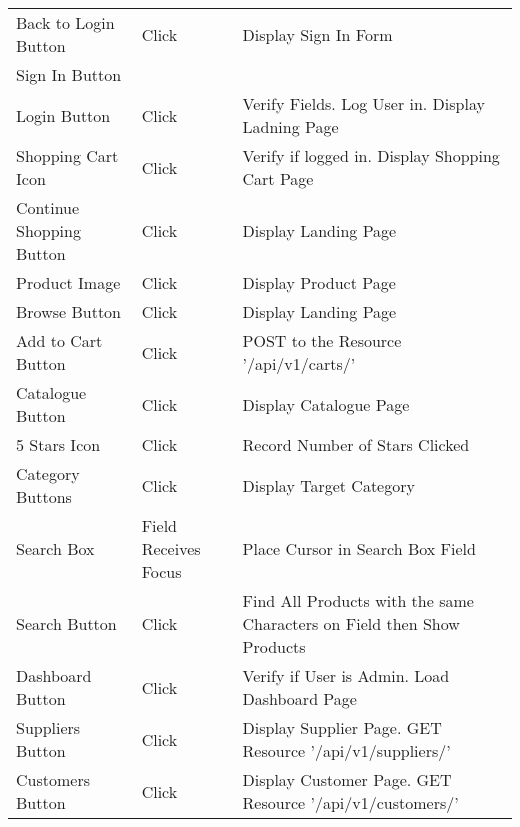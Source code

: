 \documentclass[12pt]{article}
\begin{document}
\begin{center}
	\begin{tabular}{ m{1.5in} | m{1.5in} | m{1.5in} }
	Back to Login Button & Click & Display Sign In Form \\
	Sign In Button & & \\
	\hline
	Login Button & Click & Verify Fields. Log User in. Display Ladning Page \\
	\hline
	Shopping Cart Icon & Click & Verify if logged in. Display Shopping Cart Page \\
	\hline
	Continue Shopping Button & Click & Display Landing Page \\
	\hline 
	Product Image & Click & Display Product Page \\
	\hline 
	Browse Button & Click & Display Landing Page \\
	\hline
	Add to Cart Button & Click & POST to the Resource '/api/v1/carts/' \\
	\hline 
	Catalogue Button & Click & Display Catalogue Page \\
	\hline 
	5 Stars Icon & Click & Record Number of Stars Clicked \\
	\hline
	Category Buttons & Click & Display Target Category \\
	\hline 
	Search Box & Field Receives Focus & Place Cursor in Search Box Field \\
	\hline
	Search Button & Click & Find All Products with the same Characters on Field then Show Products \\
	\hline
	Dashboard Button & Click & Verify if User is Admin. Load Dashboard Page \\
	\hline
	Suppliers Button & Click & Display Supplier Page. GET Resource '/api/v1/suppliers/' \\
	\hline
	Customers Button & Click & Display Customer Page. GET Resource '/api/v1/customers/' \\		
	\end{tabular}

	\newpage	
	

\end{center}
\end{document}
